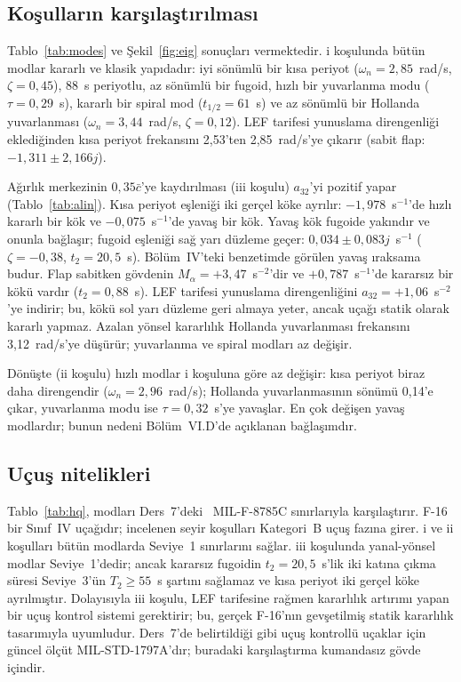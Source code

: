\documentclass[conf]{new-aiaa}
\begin{document}
\subsection{Koşulların karşılaştırılması}
Tablo~\ref{tab:modes} ve Şekil~\ref{fig:eig} sonuçları vermektedir. i koşulunda bütün modlar kararlı ve klasik yapıdadır: iyi sönümlü bir kısa periyot ($\omega_n=2,85$~rad/s, $\zeta=0,45$), 88~s periyotlu, az sönümlü bir fugoid, hızlı bir yuvarlanma modu ($\tau=0,29$~s), kararlı bir spiral mod ($t_{1/2}=61$~s) ve az sönümlü bir Hollanda yuvarlanması ($\omega_n=3,44$~rad/s, $\zeta=0,12$). LEF tarifesi yunuslama direngenliği eklediğinden kısa periyot frekansını 2,53'ten 2,85~rad/s'ye çıkarır (sabit flap: $-1,311\pm2,166j$).

Ağırlık merkezinin $0,35\bar c$'ye kaydırılması (iii koşulu) $a_{32}$'yi pozitif yapar (Tablo~\ref{tab:alin}). Kısa periyot eşleniği iki gerçel köke ayrılır: $-1,978$~s$^{-1}$'de hızlı kararlı bir kök ve $-0,075$~s$^{-1}$'de yavaş bir kök. Yavaş kök fugoide yakındır ve onunla bağlaşır; fugoid eşleniği sağ yarı düzleme geçer: $0,034\pm0,083j$~s$^{-1}$ ($\zeta=-0,38$, $t_2=20,5$~s). Bölüm~IV'teki benzetimde görülen yavaş ıraksama budur. Flap sabitken gövdenin $M_\alpha=+3,47$~s$^{-2}$'dir ve $+0,787$~s$^{-1}$'de kararsız bir kökü vardır ($t_2=0,88$~s). LEF tarifesi yunuslama direngenliğini $a_{32}=+1,06$~s$^{-2}$'ye indirir; bu, kökü sol yarı düzleme geri almaya yeter, ancak uçağı statik olarak kararlı yapmaz. Azalan yönsel kararlılık Hollanda yuvarlanması frekansını 3,12~rad/s'ye düşürür; yuvarlanma ve spiral modları az değişir.

Dönüşte (ii koşulu) hızlı modlar i koşuluna göre az değişir: kısa periyot biraz daha direngendir ($\omega_n=2,96$~rad/s); Hollanda yuvarlanmasının sönümü 0,14'e çıkar, yuvarlanma modu ise $\tau=0,32$~s'ye yavaşlar. En çok değişen yavaş modlardır; bunun nedeni Bölüm~VI.D'de açıklanan bağlaşımdır.

\subsection{Uçuş nitelikleri}
Tablo~\ref{tab:hq}, modları Ders~7'deki~\cite{lec7} MIL-F-8785C sınırlarıyla karşılaştırır. F-16 bir Sınıf~IV uçağıdır; incelenen seyir koşulları Kategori~B uçuş fazına girer. i ve ii koşulları bütün modlarda Seviye~1 sınırlarını sağlar. iii koşulunda yanal-yönsel modlar Seviye~1'dedir; ancak kararsız fugoidin $t_2=20,5$~s'lik iki katına çıkma süresi Seviye~3'ün $T_2\ge55$~s şartını sağlamaz ve kısa periyot iki gerçel köke ayrılmıştır. Dolayısıyla iii koşulu, LEF tarifesine rağmen kararlılık artırımı yapan bir uçuş kontrol sistemi gerektirir; bu, gerçek F-16'nın gevşetilmiş statik kararlılık tasarımıyla uyumludur. Ders~7'de belirtildiği gibi uçuş kontrollü uçaklar için güncel ölçüt MIL-STD-1797A'dır; buradaki karşılaştırma kumandasız gövde içindir.
\end{document}
